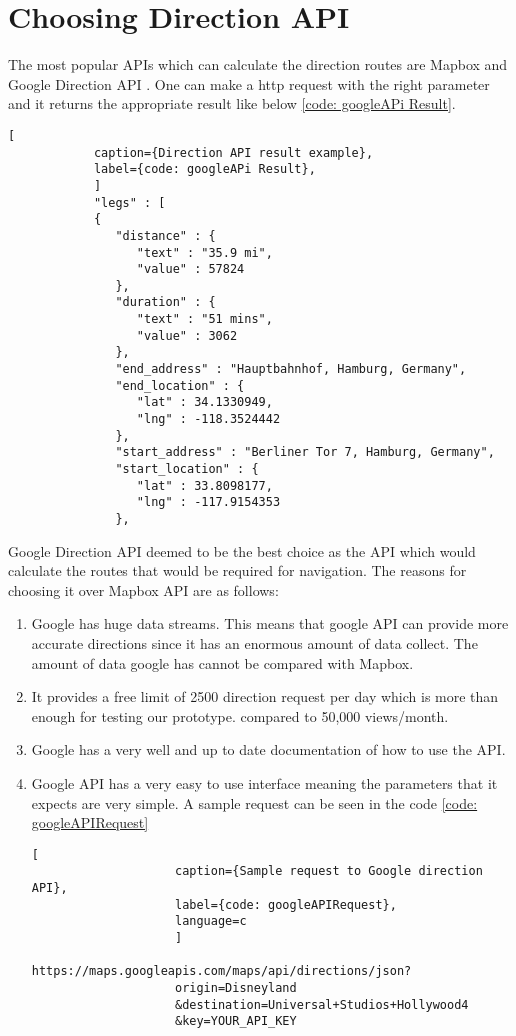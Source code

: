 \section{Choosing Direction API}  
        The most popular APIs which can calculate the direction routes are Mapbox \cite{mapbox} 
        and Google Direction API \cite{googleDirecAPI}. One can make a http request with the 
        right parameter and it returns the appropriate result like below \ref{code: googleAPi Result}.
        \begin{lstlisting}[
            caption={Direction API result example}, 
            label={code: googleAPi Result},
            ]
            "legs" : [
            {
               "distance" : {
                  "text" : "35.9 mi",
                  "value" : 57824
               },
               "duration" : {
                  "text" : "51 mins",
                  "value" : 3062
               },
               "end_address" : "Hauptbahnhof, Hamburg, Germany",
               "end_location" : {
                  "lat" : 34.1330949,
                  "lng" : -118.3524442
               },
               "start_address" : "Berliner Tor 7, Hamburg, Germany",
               "start_location" : {
                  "lat" : 33.8098177,
                  "lng" : -117.9154353
               },  
        \end{lstlisting}
    
        Google Direction API deemed to be the best choice as the API which
        would calculate the routes that would be required for navigation.
        The reasons for choosing it over Mapbox API are as follows:

        \begin{enumerate}  
            \item 
                Google has huge data streams. This means that google API can provide more
                accurate directions since it has an enormous amount of data collect. The amount
                of data google has cannot be compared with Mapbox.
            \item
                It provides a free limit of 2500 direction request per day which is more than enough for testing our prototype.
                compared to  50,000 views/month.
            \item
                Google has a very well and up to date documentation of how to use the API.  
            \item
                Google API has a very easy to use interface meaning the parameters that it expects are very simple. A sample request can be seen in the code \ref{code: googleAPIRequest}
                \begin{lstlisting}[
                    caption={Sample request to Google direction API}, 
                    label={code: googleAPIRequest},
                    language=c
                    ]
                    https://maps.googleapis.com/maps/api/directions/json?
                    origin=Disneyland
                    &destination=Universal+Studios+Hollywood4
                    &key=YOUR_API_KEY
                \end{lstlisting}    
        \end{enumerate}